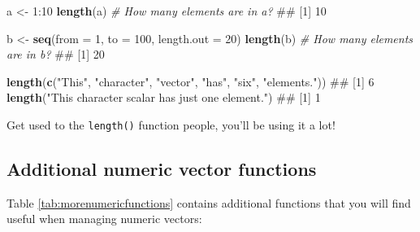 \documentclass[]{book}
\newenvironment{Shaded}{\begin{snugshade}}{\end{snugshade}}
\newcommand{\KeywordTok}[1]{\textcolor[rgb]{0.13,0.29,0.53}{\textbf{{#1}}}}
\newcommand{\DataTypeTok}[1]{\textcolor[rgb]{0.13,0.29,0.53}{{#1}}}
\newcommand{\DecValTok}[1]{\textcolor[rgb]{0.00,0.00,0.81}{{#1}}}
\newcommand{\StringTok}[1]{\textcolor[rgb]{0.31,0.60,0.02}{{#1}}}
\newcommand{\CommentTok}[1]{\textcolor[rgb]{0.56,0.35,0.01}{\textit{{#1}}}}
\newcommand{\NormalTok}[1]{{#1}}
\theoremstyle{definition}
\theoremstyle{definition}
\theoremstyle{remark}
\begin{document}
\begin{Shaded}
\begin{Highlighting}[]
\NormalTok{a <-}\StringTok{ }\DecValTok{1}\NormalTok{:}\DecValTok{10}
\KeywordTok{length}\NormalTok{(a)  }\CommentTok{# How many elements are in a?}
\NormalTok{## [1] 10}

\NormalTok{b <-}\StringTok{ }\KeywordTok{seq}\NormalTok{(}\DataTypeTok{from =} \DecValTok{1}\NormalTok{, }\DataTypeTok{to =} \DecValTok{100}\NormalTok{, }\DataTypeTok{length.out =} \DecValTok{20}\NormalTok{)}
\KeywordTok{length}\NormalTok{(b)  }\CommentTok{# How many elements are in b?}
\NormalTok{## [1] 20}

\KeywordTok{length}\NormalTok{(}\KeywordTok{c}\NormalTok{(}\StringTok{"This"}\NormalTok{, }\StringTok{"character"}\NormalTok{, }\StringTok{"vector"}\NormalTok{, }\StringTok{"has"}\NormalTok{, }\StringTok{"six"}\NormalTok{, }\StringTok{"elements."}\NormalTok{))}
\NormalTok{## [1] 6}
\KeywordTok{length}\NormalTok{(}\StringTok{"This character scalar has just one element."}\NormalTok{)}
\NormalTok{## [1] 1}
\end{Highlighting}
\end{Shaded}

Get used to the \texttt{length()} function people, you'll be using it a
lot!

\subsection{Additional numeric vector
functions}\label{additional-numeric-vector-functions}

Table \ref{tab:morenumericfunctions} contains additional functions that
you will find useful when managing numeric vectors:
\end{document}
